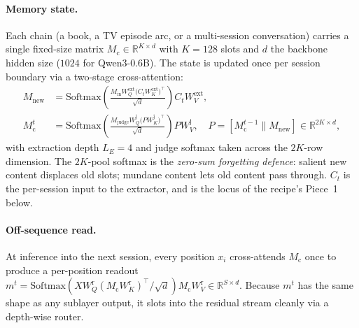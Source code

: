 \documentclass{article}
\newcommand{\Mc}{M_{\text{c}}}
\newcommand{\Min}{M_{\text{in}}}
\newcommand{\Mj}{M_{\text{judge}}}
\newcommand{\Mnew}{M_{\text{new}}}
\begin{document}
\paragraph{Memory state.} Each chain (a book, a TV episode arc, or
a multi-session conversation) carries a single fixed-size matrix
$\Mc \in \mathbb{R}^{K\times d}$ with $K{=}128$ slots and $d$ the
backbone hidden size ($1024$ for Qwen3-0.6B). The state is updated
once per session boundary via a two-stage cross-attention:
\begin{align}
\Mnew &= \mathrm{Softmax}\!\left(\tfrac{\Min W_Q^{\text{ext}}\bigl(C_t W_K^{\text{ext}}\bigr)^\top}{\sqrt{d}}\right) C_t W_V^{\text{ext}},
\label{eq:extract}\\
\Mc^{t} &= \mathrm{Softmax}\!\left(\tfrac{\Mj W_Q^{\text{j}}\bigl(P W_K^{\text{j}}\bigr)^\top}{\sqrt{d}}\right) P W_V^{\text{j}},
\quad P = [\Mc^{t-1} \parallel \Mnew] \in \mathbb{R}^{2K\times d},
\label{eq:judge}
\end{align}
with extraction depth $L_E{=}4$ and judge softmax taken across the
$2K$-row dimension. The $2K$-pool softmax is the
\emph{zero-sum forgetting defence}: salient new content displaces
old slots; mundane content lets old content pass through.
$C_t$ is the per-session input to the extractor, and is the
locus of the recipe's Piece~1 below.

\paragraph{Off-sequence read.} At inference into the next session,
every position $x_i$ cross-attends $\Mc$ once to produce a
per-position readout
$m^t = \mathrm{Softmax}(X W_Q^{\text{r}}(\Mc W_K^{\text{r}})^\top/\sqrt{d})\Mc W_V^{\text{r}} \in \mathbb{R}^{S\times d}$.
Because $m^t$ has the same shape as any sublayer output, it slots
into the residual stream cleanly via a depth-wise router.
\end{document}
